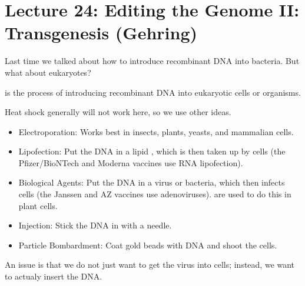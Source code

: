 \section*{Lecture 24: Editing the Genome II: Transgenesis (Gehring)}
\setcounter{section}{24}

Last time we talked about how to introduce recombinant DNA into bacteria. But what about eukaryotes?

\begin{defn}
	 is the process of introducing recombinant DNA into eukaryotic cells or organisms.
\end{defn}

\begin{exm}
	Heat shock generally will not work here, so we use other ideas.
	\begin{itemize}
		\item Electroporation: Works best in insects, plants, yeasts, and mammalian cells.
		\item Lipofection: Put the DNA in a lipid , which is then taken up by cells (the Pfizer/BioNTech and Moderna vaccines use RNA lipofection).
		\item Biological Agents: Put the DNA in a virus or bacteria, which then infects cells (the Janssen and AZ vaccines use adenoviruses).  are used to do this in plant cells.
		\item Injection: Stick the DNA in with a needle.
		\item Particle Bombardment: Coat gold beads with DNA and shoot the cells.
	\end{itemize}
\end{exm}

An issue is that we do not just want to get the virus into cells; instead, we want to actualy insert the DNA.

